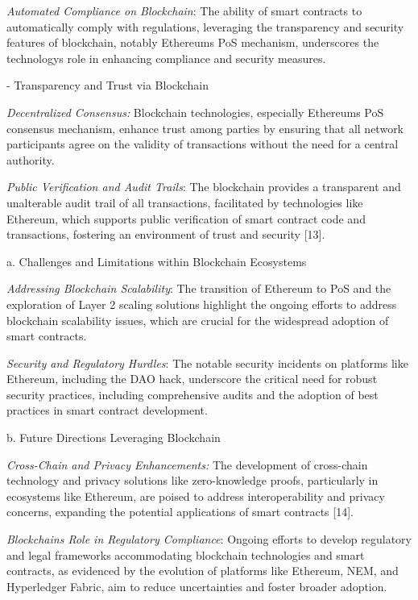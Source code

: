 \emph{Automated Compliance on Blockchain}: The ability of smart
contracts to automatically comply with regulations, leveraging the
transparency and security features of blockchain, notably
Ethereum\textquotesingle s PoS mechanism, underscores the
technology\textquotesingle s role in enhancing compliance and security
measures.

- Transparency and Trust via Blockchain

\emph{Decentralized Consensus:} Blockchain technologies, especially
Ethereum\textquotesingle s PoS consensus mechanism, enhance trust among
parties by ensuring that all network participants agree on the validity
of transactions without the need for a central authority.

\emph{Public Verification and Audit Trails}: The blockchain provides a
transparent and unalterable audit trail of all transactions, facilitated
by technologies like Ethereum, which supports public verification of
smart contract code and transactions, fostering an environment of trust
and security {[}13{]}.

a. Challenges and Limitations within Blockchain Ecosystems

\emph{Addressing Blockchain Scalability}: The transition of Ethereum to
PoS and the exploration of Layer 2 scaling solutions highlight the
ongoing efforts to address blockchain scalability issues, which are
crucial for the widespread adoption of smart contracts.

\emph{Security and Regulatory Hurdles}: The notable security incidents
on platforms like Ethereum, including the DAO hack, underscore the
critical need for robust security practices, including comprehensive
audits and the adoption of best practices in smart contract development.

b. Future Directions Leveraging Blockchain

\emph{Cross-Chain and Privacy Enhancements:} The development of
cross-chain technology and privacy solutions like zero-knowledge proofs,
particularly in ecosystems like Ethereum, are poised to address
interoperability and privacy concerns, expanding the potential
applications of smart contracts {[}14{]}.

\emph{Blockchain\textquotesingle s Role in Regulatory Compliance}:
Ongoing efforts to develop regulatory and legal frameworks accommodating
blockchain technologies and smart contracts, as evidenced by the
evolution of platforms like Ethereum, NEM, and Hyperledger Fabric, aim
to reduce uncertainties and foster broader adoption.

